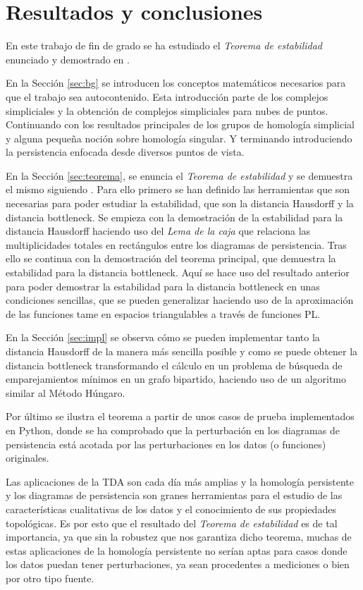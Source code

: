 \chapter{Resultados y conclusiones}
En este trabajo de fin de grado se ha estudiado el \emph{Teorema de estabilidad} enunciado y demostrado en \cite{Cohen-Steiner2007}.

En la Sección \ref{sec:bg} se introducen los conceptos matemáticos necesarios para que el trabajo sea autocontenido. Esta introducción parte de los complejos simpliciales y la obtención de complejos simpliciales para nubes de puntos. Continuando con los resultados principales de los grupos de homología simplicial y alguna pequeña noción sobre homología singular. Y terminando introduciendo la persistencia enfocada desde diversos puntos de vista.

En la Sección \ref{sec:teorema}, se enuncia el \emph{Teorema de estabilidad} y se demuestra el mismo siguiendo \cite{Cohen-Steiner2007}. Para ello primero se han definido las herramientas que son necesarias para poder estudiar la estabilidad, que son la distancia Hausdorff y la distancia bottleneck. Se empieza con la demostración de la estabilidad para la distancia Hausdorff haciendo uso del \emph{Lema de la caja} que relaciona las multiplicidades totales en rectángulos entre los diagramas de persistencia. Tras ello se continua con la demostración del teorema principal, que demuestra la estabilidad para la distancia bottleneck. Aquí se hace uso del resultado anterior para poder demostrar la estabilidad para la distancia bottleneck en unas condiciones sencillas, que se pueden generalizar haciendo uso de la aproximación de las funciones tame en espacios triangulables a través de funciones PL.

En la Sección \ref{sec:impl} se observa cómo se pueden implementar tanto la distancia Hausdorff de la manera más sencilla posible y como se puede obtener la distancia bottleneck transformando el cálculo en un problema de búsqueda de emparejamientos mínimos en un grafo bipartido, haciendo uso de un algoritmo similar al Método Húngaro.

Por último se ilustra el teorema a partir de unos casos de prueba implementados en Python, donde se ha comprobado que la perturbación en los diagramas de persistencia está acotada por las perturbaciones en los datos (o funciones) originales.

Las aplicaciones de la TDA son cada día más amplias y la homología persistente y los diagramas de persistencia son granes herramientas para el estudio de las características cualitativas de los datos y el conocimiento de sus propiedades topológicas. Es por esto que el resultado del \emph{Teorema de estabilidad} es de tal importancia, ya que sin la robustez que nos garantiza dicho teorema, muchas de estas aplicaciones de la homología persistente no serían aptas para casos donde los datos puedan tener perturbaciones, ya sean procedentes a mediciones o bien por otro tipo fuente. 